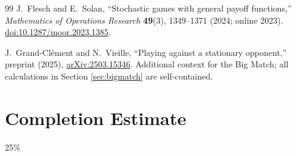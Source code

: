 \documentclass[11pt,a4paper]{article}
\theoremstyle{definition}
\theoremstyle{remark}
\begin{document}
\begin{thebibliography}{99}
J.~Flesch and E.~Solan, ``Stochastic games with general payoff functions,'' \emph{Mathematics of Operations Research} \textbf{49}(3), 1349--1371 (2024; online 2023). \href{https://doi.org/10.1287/moor.2023.1385}{doi:10.1287/moor.2023.1385}.

J.~Grand-Cl\'ement and N.~Vieille, ``Playing against a stationary opponent,'' preprint (2025), \href{https://arxiv.org/abs/2503.15346}{arXiv:2503.15346}. Additional context for the Big Match; all calculations in Section \ref{sec:bigmatch} are self-contained.
\end{thebibliography}
\endgroup
\section{Completion Estimate}
25\%
\end{document}
